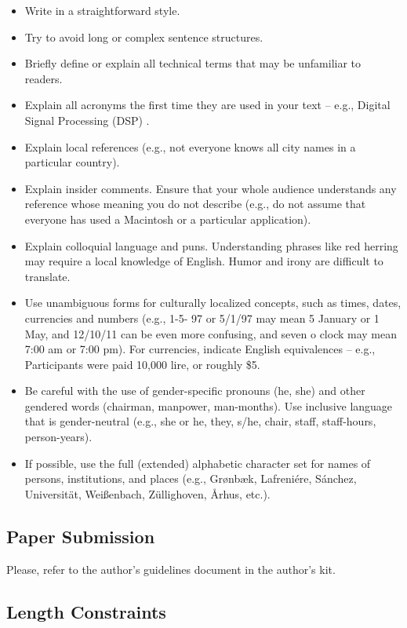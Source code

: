 \documentclass{article}
\begin{document}
\begin{itemize}
\item{Write in a straightforward style.}
\item{Try to avoid long or complex sentence structures.}
\item{Briefly define or explain all technical terms that may be unfamiliar to readers.}
\item{Explain all acronyms the first time they are used in your text -- e.g.,  Digital Signal Processing (DSP) .}
\item{Explain local references (e.g., not everyone knows all city names in a particular country).}
\item{Explain  insider  comments. Ensure that your whole audience understands any reference whose meaning you do not describe (e.g., do not assume that everyone has used a Macintosh or a particular application).}
\item{Explain colloquial language and puns. Understanding phrases like  red herring  may require a local knowledge of English. Humor and irony are difficult to translate.}
\item{Use unambiguous forms for culturally localized concepts, such as times, dates, currencies and numbers (e.g.,  1-5- 97  or  5/1/97  may mean 5 January or 1 May, and  12/10/11  can be even more confusing, and  seven o clock  may mean 7:00 am or 7:00 pm).  For currencies, indicate English equivalences -- e.g.,  Participants were paid 10,000 lire, or roughly \$5. }
\item{Be careful with the use of gender-specific pronouns (he, she) and other gendered words (chairman, manpower, man-months). Use inclusive language that is gender-neutral (e.g., she or he, they, s/he, chair, staff, staff-hours, person-years).}
\item{If possible, use the full (extended) alphabetic character set for names of persons, institutions, and places (e.g., {Gr\o nb\ae k}, Lafreni\'ere, S\'anchez, Universit\"at, {Wei\ss enbach}, Z\"ullighoven, {\AA rhus}, etc.).}
\end{itemize}

\subsection{Paper Submission}

Please, refer to the author's guidelines document in the author's kit.

\subsection{Length Constraints}
\end{document}
